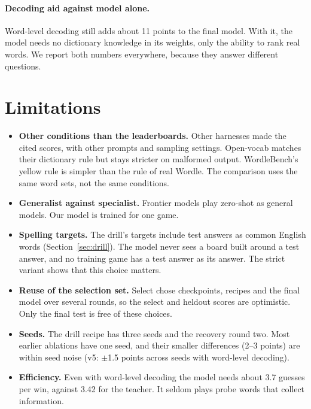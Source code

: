 \documentclass{article}
\begin{document}
\paragraph{Decoding aid against model alone.} Word-level decoding still adds about 11 points to the final model. With it, the model needs no dictionary knowledge in its weights, only the ability to rank real words. We report both numbers everywhere, because they answer different questions.

\section{Limitations}
\label{sec:limitations}
\begin{itemize}
\item \textbf{Other conditions than the leaderboards.} Other harnesses made the cited scores, with other prompts and sampling settings. Open-vocab matches their dictionary rule but stays stricter on malformed output. WordleBench's yellow rule is simpler than the rule of real Wordle. The comparison uses the same word sets, not the same conditions.
\item \textbf{Generalist against specialist.} Frontier models play zero-shot as general models. Our model is trained for one game.
\item \textbf{Spelling targets.} The drill's targets include test answers as common English words (Section~\ref{sec:drill}). The model never sees a board built around a test answer, and no training game has a test answer as its answer. The strict variant shows that this choice matters.
\item \textbf{Reuse of the selection set.} Select chose checkpoints, recipes and the final model over several rounds, so the select and heldout scores are optimistic. Only the final test is free of these choices.
\item \textbf{Seeds.} The drill recipe has three seeds and the recovery round two. Most earlier ablations have one seed, and their smaller differences (2--3 points) are within seed noise (v5: $\pm$1.5 points across seeds with word-level decoding).
\item \textbf{Efficiency.} Even with word-level decoding the model needs about 3.7 guesses per win, against 3.42 for the teacher. It seldom plays probe words that collect information.
\end{itemize}

\end{document}
